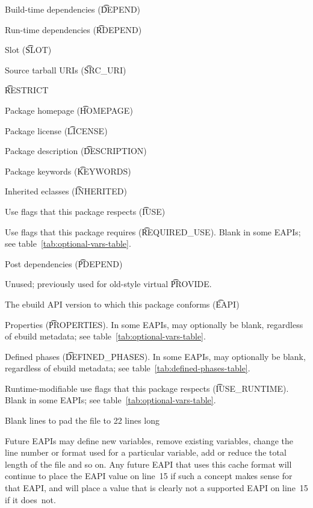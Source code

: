 \begin{compactenum}
\item Build-time dependencies (\t{DEPEND})
\item Run-time dependencies (\t{RDEPEND})
\item Slot (\t{SLOT})
\item Source tarball URIs (\t{SRC_URI})
\item \t{RESTRICT}
\item Package homepage (\t{HOMEPAGE})
\item Package license (\t{LICENSE})
\item Package description (\t{DESCRIPTION})
\item Package keywords (\t{KEYWORDS})
\item Inherited eclasses (\t{INHERITED})
\item Use flags that this package respects (\t{IUSE})
\item Use flags that this package requires (\t{REQUIRED_USE}).
    Blank in some EAPIs; see table~\ref{tab:optional-vars-table}.
\item Post dependencies (\t{PDEPEND})
\item Unused; previously used for old-style virtual \t{PROVIDE}.
\item The ebuild API version to which this package conforms (\t{EAPI})
\item Properties (\t{PROPERTIES}). In some EAPIs, may optionally be blank, regardless of ebuild
    metadata; see table~\ref{tab:optional-vars-table}.
\item Defined phases (\t{DEFINED_PHASES}). In some EAPIs, may optionally be blank, regardless of
    ebuild metadata; see table~\ref{tab:defined-phases-table}.
\item Runtime-modifiable use flags that this package respects (\t{IUSE_RUNTIME}).
    Blank in some EAPIs; see table~\ref{tab:optional-vars-table}.
\item Blank lines to pad the file to 22 lines long
\end{compactenum}

Future EAPIs may define new variables, remove existing variables, change the line number or
format used for a particular variable, add or reduce the total length of the file and so on.
Any future EAPI that uses this cache format will continue to place the EAPI value on line~15 if
such a concept makes sense for that EAPI, and will place a value that is clearly not a supported
EAPI on line~15 if it does~not.


